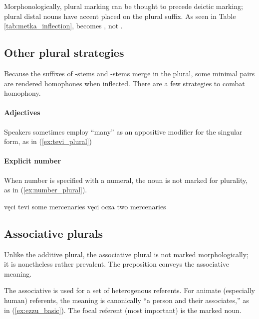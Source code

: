 Morphonologically, plural marking can be thought to precede deictic marking; plural distal nouns have accent placed on the plural suffix. As seen in Table \ref{tab:metka_inflection},  becomes , not .

\subsection{Other plural strategies}
Because the suffixes of -stems and -stems merge in the plural, some minimal pairs are rendered homophones when inflected. There are a few strategies to combat homophony. 

\paragraph{Adjectives}
Speakers sometimes employ  “many” as an appositive modifier for the singular form, as in (\ref{ex:tevi_plural})

\paragraph{Explicit number}
When number is specified with a numeral, the noun is not marked for plurality, as in (\ref{ex:number_plural}).

\begin{subexamples}
    \ex \label{ex:tevi_plural}
        \script vęci tevi
        \tr some mercenaries
    \ex \label{ex:number_plural}
        \script vęci ocza
        \tr two mercenaries
\end{subexamples}

\subsection{Associative plurals}
Unlike the additive plural, the associative plural is not marked morphologically; it is nonetheless rather prevalent. The preposition  conveys the associative meaning.

The associative is used for a set of heterogenous referents. For animate (especially human) referents, the meaning is canonically “a person and their associates,” as in (\ref{ex:ezzu_basic}). The focal referent (\ie most important) is the marked noun.

